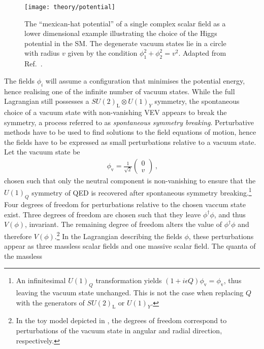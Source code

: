\begin{figure}[htbp]
  \centering

  \texttt{[image: theory/potential]}

  \caption{The ``mexican-hat potential'' of a single complex scalar field as a
    lower dimensional example illustrating the choice of the Higgs potential in
    the SM. The degenerate vacuum states lie in a circle with radius $v$ given
    by the condition $\phi_1^2 + \phi_2^2 = v^2$. Adapted from
    Ref.~\cite{higgs_potential_tikz}.}%
  \label{fig:mexican_hat}
\end{figure}

The fields $\phi_i$ will assume a configuration that minimises the potential
energy, hence realising one of the infinite number of vacuum states. While the
full Lagrangian still possesses a $SU(2)_{\text{L}} \otimes U(1)_Y$ symmetry,
the spontaneous choice of a vacuum state with non-vanishing VEV appears to break
the symmetry, a process referred to as \emph{spontaneous symmetry
  breaking}. Perturbative methods have to be used to find solutions to the field
equations of motion, hence the fields have to be expressed as small
perturbations relative to a vacuum state. Let the vacuum state be
\begin{align*}
  \phi_{\text{v}} = \frac{1}{\sqrt{2}}
  \begin{pmatrix}
    0 \\
    v
  \end{pmatrix} \,\text{,}
\end{align*}
chosen such that only the neutral component is non-vanishing to ensure that the
$U(1)_Q$ symmetry of QED is recovered after spontaneous symmetry
breaking.\footnote{An infinitesimal $U(1)_Q$ transformation yields
  $(1 + i \epsilon Q) \phi_{\text{v}} = \phi_{\text{v}}$, thus leaving the
  vacuum state unchanged. This is not the case when replacing $Q$ with the
  generators of $SU(2)_{\text{L}}$ or $U(1)_Y$.} Four degrees of freedom for
perturbations relative to the chosen vaccum state exist. Three degrees of
freedom are chosen such that they leave $\phi^\dagger \phi$, and thus $V(\phi)$,
invariant. The remaining degree of freedom alters the value of
$\phi^\dagger \phi$ and therefore $V(\phi)$.\footnote{In the toy model depicted
  in , the degrees of freedom correspond to perturbations
  of the vacuum state in angular and radial direction, respectively.} In the
Lagrangian describing the fields $\phi$, these perturbations appear as three
massless scalar fields and one massive scalar field. The quanta of the massless

